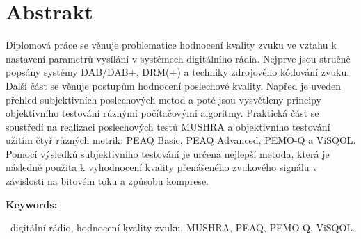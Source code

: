 \chapter*{Abstrakt}
\label{abstract:czech}

Diplomová práce se věnuje problematice hodnocení kvality zvuku ve vztahu k nastavení parametrů vysílání v systémech digitálního rádia. Nejprve jsou stručně popsány systémy DAB/DAB+, DRM(+) a techniky zdrojového kódování zvuku. Další část se věnuje postupům hodnocení poslechové kvality. Napřed je uveden přehled subjektivních poslechových metod a poté jsou vysvětleny principy objektivního testování různými počítačovými algoritmy. Praktická část se soustředí na realizaci poslechových testů MUSHRA a objektivního testování užitím čtyř různých metrik: PEAQ Basic, PEAQ Advanced, PEMO-Q a ViSQOL. Pomocí výsledků subjektivního testování je určena nejlepší metoda, která je následně použita k vyhodnocení kvality přenášeného zvukového signálu v závislosti na bitovém toku a způsobu komprese.

\bigskip

\noindent\textbf{Keywords:}

~digitální rádio, hodnocení kvality zvuku, MUSHRA, PEAQ, PEMO-Q, ViSQOL.

\vfill

